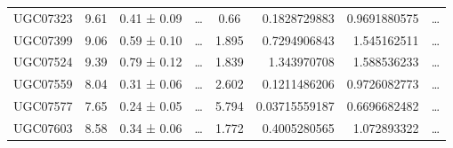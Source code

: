 \documentclass[reprint,%
 amsmath,amssymb,
 aps,
]{revtex4-1}
\begin{document}
\begin{table}[]
\begin{tabular}{cccccrrc}
\rowcolor[HTML]{F3F3F3} 
UGC07323             & 9.61                      & 0.41 ± 0.09           & …                      & 0.66                                                         & 0.1828729883                                                          & 0.9691880575                                                          & …                                                             \\
\rowcolor[HTML]{F3F3F3} 
UGC07399             & 9.06                      & 0.59 ± 0.10           & …                      & 1.895                                                        & 0.7294906843                                                          & 1.545162511                                                           & …                                                             \\
\rowcolor[HTML]{F3F3F3} 
UGC07524             & 9.39                      & 0.79 ± 0.12           & …                      & 1.839                                                        & 1.343970708                                                           & 1.588536233                                                           & …                                                             \\
\rowcolor[HTML]{F3F3F3} 
UGC07559             & 8.04                      & 0.31 ± 0.06           & …                      & 2.602                                                        & 0.1211486206                                                          & 0.9726082773                                                          & …                                                             \\
\rowcolor[HTML]{F3F3F3} 
UGC07577             & 7.65                      & 0.24 ± 0.05           & …                      & 5.794                                                        & 0.03715559187                                                         & 0.6696682482                                                          & …                                                             \\
\rowcolor[HTML]{F3F3F3} 
UGC07603             & 8.58                      & 0.34 ± 0.06           & …                      & 1.772                                                        & 0.4005280565                                                          & 1.072893322                                                           & …                                                             \\

\end{tabular}
\end{table}
\end{document}
